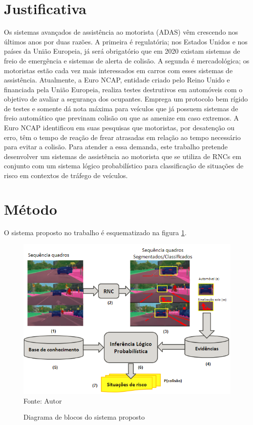 \documentclass[
	12pt,				%
    oneside,			%
	a4paper,			%
	english,			%
	french,				%
	spanish,			%
	brazil,				%
	]{abntex2}
\begin{document}
\section {Justificativa}
Os sistemas avançados de assistência ao motorista (ADAS) vêm crescendo nos últimos anos por duas razões. A primeira é regulatória; nos Estados Unidos e nos países da União Europeia, já será obrigatório que em 2020 existam sistemas de freio de emergência e sistemas de alerta de colisão. A segunda é mercadológica; os motoristas estão cada vez mais interessados em carros com esses sistemas de assistência. Atualmente, a Euro NCAP, entidade criado pelo Reino Unido e financiada pela União Europeia, realiza testes destrutivos em automóveis com o objetivo de avaliar a segurança dos ocupantes. Emprega um protocolo bem rígido de testes e somente dá nota máxima para veículos que já possuem sistemas de freio automático que previnam colisão ou que as amenize em caso extremos. A Euro NCAP identificou em suas pesquisas que motoristas, por desatenção ou erro, têm o tempo de reação de frear atrasadas em relação ao tempo necessário para evitar a colisão. Para atender a essa demanda, este trabalho pretende desenvolver um sistemas de assistência ao motorista que se utiliza de RNCs em conjunto com um sistema lógico probabilístico para classificação de situações de risco em contextos de tráfego de veículos.
\section {Método}

O sistema proposto no trabalho é esquematizado na figura \ref{fig:diagrama_de_blocos}.

\begin{figure}[H]
    \centering
    \caption{Diagrama de blocos do sistema proposto}
    \includegraphics[width=\textwidth]{diagrama_de_blocos_v6}\\
    Fonte: Autor\hfill
    \label{fig:diagrama_de_blocos}
\end{figure} 
\end{document}
